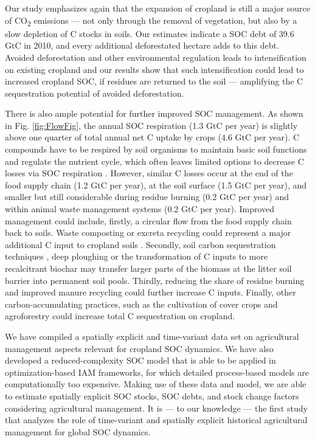 \documentclass[gc, manuscript]{copernicus}
\begin{document}
Our study emphasizes again that the expansion of cropland is still a major source of CO\textsubscript{2} emissions --- not only through the removal of vegetation, but also by a slow depletion of C stocks in soils. Our estimates indicate a SOC debt of 39.6 GtC in 2010, and every additional deforestated hectare adds to this debt. Avoided deforestation and other environmental regulation leads to intensification on existing cropland \citep{humpenoder_large-scale_2018} and our results show that such intensification could lead to increased cropland SOC, if residues are returned to the soil --- amplifying the C sequestration potential of avoided deforestation.

There is also ample potential for further improved SOC management. As shown in Fig. \ref{fig:FlowFig}, the annual SOC respiration (1.3 GtC per year) is slightly above one quarter of total annual net C uptake by crops (4.6 GtC per year). C compounds have to be respired by soil organisms to maintain basic soil functions and regulate the nutrient cycle, which often leaves limited options to decrease C losses via SOC respiration \citep{janzen_soil_2006}.
However, similar C losses occur at the end of the food supply chain (1.2 GtC per year), at the soil surface (1.5 GtC per year), and smaller but still considerable during residue burning (0.2 GtC per year) and within animal waste management systems (0.2 GtC per year). Improved management could include, firstly, a circular flow from the food supply chain back to soils. Waste composting or excreta recycling could represent a major additional C input to cropland soils \citep{brenzinger_organic_2018}. Secondly, soil carbon sequestration techniques \citep{smith_soil_2016}, deep ploughing \citep{alcantara_deep_2016} or the transformation of C inputs to more recalcitrant biochar \citep{woolf_sustainable_2010} may transfer larger parts of the biomass at the litter soil barrier into permanent soil pools. Thirdly, reducing the share of residue burning and improved manure recycling could further increase C inputs. Finally, other carbon-accumulating practices, such as the cultivation of cover crops \citep{poeplau_carbon_2015, porwollik_covercrops_2022} and agroforestry \citep{lorenz_soil_2014} could increase total C sequestration on cropland.
\newpage

\conclusions

We have compiled a spatially explicit and time-variant data set on agricultural management aspects relevant for cropland SOC dynamics. We have also developed a reduced-complexity SOC model that is able to be applied in optimization-based IAM frameworks, for which detailed process-based models are computationally too expensive. Making use of these data and model, we are able to estimate spatially explicit SOC stocks, SOC debts, and stock change factors considering agricultural management. It is --- to our knowledge --- the first study that analyzes the role of time-variant and spatially explicit historical agricultural management for global SOC dynamics.
\end{document}
